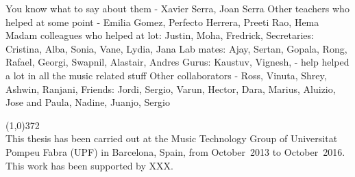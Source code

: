 
You know what to say about them - Xavier Serra, Joan Serra
Other teachers who helped at some point -  Emilia Gomez, Perfecto Herrera, Preeti Rao, Hema Madam
colleagues who helped at lot: Justin, Moha, Fredrick,
Secretaries: Cristina, Alba, Sonia, Vane, Lydia, Jana
Lab mates: Ajay, Sertan, Gopala, Rong, Rafael, Georgi, Swapnil, Alastair, Andres
Gurus:  Kaustuv, Vignesh, -  help helped a lot in all the music related stuff
Other collaborators - Ross, Vinuta, Shrey, Ashwin, Ranjani, 
Friends: Jordi, Sergio, Varun, Hector, Dara, Marius, Aluizio, Jose and Paula, Nadine, Juanjo, Sergio

\vspace*{\fill}

\line(1,0){372}\\
\footnotesize
This thesis has been carried out at the Music Technology Group of Universitat Pompeu Fabra (UPF) in Barcelona, Spain, from October~2013 to October~2016. This work has been supported by XXX.
\normalsize